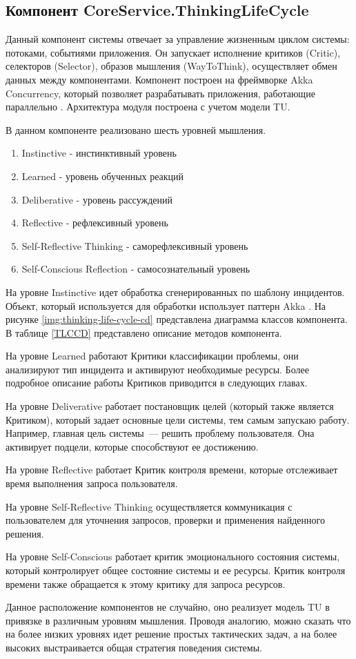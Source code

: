\subsection{Компонент CoreService.ThinkingLifeCycle} \label{ThinkingLifeCycle}
Данный компонент системы отвечает за управление жизненным циклом системы: потоками, событиями приложения. Он запускает исполнение критиков (Critic), селекторов (Selector), образов мышления (WayToThink), осуществляет обмен данных между компонентами. Компонент построен на фреймворке Akka Concurrency, который позволяет разрабатывать приложения, работающие параллельно \cite{AkkaConcurrency}. Архитектура модуля построена с учетом модели TU. \par
В данном компоненте реализовано шесть уровней мышления.
\begin{enumerate}
	\item Instinctive - инстинктивный уровень
	\item Learned - уровень обученных реакций
	\item Deliberative - уровень рассуждений
	\item Reflective - рефлексивный уровень
	\item Self-Reflective Thinking - саморефлексивный уровень
	\item Self-Conscious Reflection - самосознательный уровень
\end{enumerate}

На уровне Instinctive идет обработка сгенерированных по шаблону инцидентов.
Объект, который используется для обработки использует паттерн Akka \cite{AkkaConcurrency}. На рисунке \ref{img:thinking-life-cycle-cd} представлена диаграмма классов компонента.  В таблице \ref{TLCCD} представлено описание методов компонента. \par
На уровне Learned работают Критики классификации проблемы, они анализируют тип инцидента и активируют необходимые ресурсы. Более подробное описание работы Критиков приводится в следующих главах. \par
На уровне Deliverative работает постановщик целей (который также является Критиком), который задает основные цели системы, тем самым запускаю работу. Например, главная цель системы~--- решить проблему пользователя. Она активирует подцели, которые способствуют ее достижению. \par
На уровне Reflective работает Критик контроля времени, которые отслеживает время выполнения запроса пользователя. \par
На уровне Self-Reflective Thinking осуществляется коммуникация с пользователем для уточнения запросов, проверки и применения найденного решения. \par
На уровне Self-Conscious работает критик эмоционального состояния системы, который контролирует общее состояние системы и ее ресурсы. Критик контроля времени также обращается к этому критику для запроса ресурсов. \par
Данное расположение компонентов не случайно, оно реализует модель TU в привязке в различным уровням мышления. Проводя аналогию, можно сказать что на более низких уровнях идет решение простых тактических задач, а на более высоких выстраивается общая стратегия поведения системы.
 
